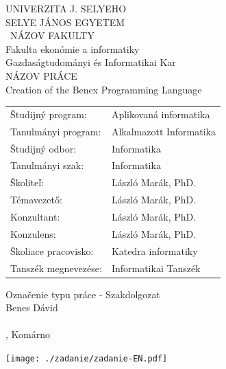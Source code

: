 \documentclass[a4paper,oneside,onecolumn,12pt]{LegrandOrangeBook}
\begin{document}
\begingroup
\makeatletter
\let\ps@plain\ps@empty
\begin{minipage}[c][\textheight][c]{\textwidth}
	{
        \centering
	    {\large UNIVERZITA J. SELYEHO\\SELYE JÁNOS EGYETEM} \\
	    \vskip0.5cm
        {\ NÁZOV FAKULTY\\Fakulta ekonómie a informatiky\\Gazdaságtudományi és Informatikai Kar} \\
        \vfill
        {\Large NÁZOV PRÁCE\\Creation of the Benex Programming Language } \\
        \vfill
        \thispagestyle{empty}
        \begin{tabular}{ll}
            Študijný program:    & Aplikovaná informatika \\
            Tanulmányi program:  & Alkalmazott Informatika \\
            Študijný odbor:      & Informatika \\
            Tanulmányi szak:     & Informatika \\
            Školiteľ:            & László Marák, PhD. \\
            Témavezető:          & László Marák, PhD. \\
            Konzultant:          & László Marák, PhD. \\
            Konzulens:           & László Marák, PhD. \\
            Školiace pracovisko: & Katedra informatiky \\
            Tanszék megnevezése: & Informatikai Tanszék \\
        \end{tabular}
        \vfill
        Označenie typu práce - Szakdolgozat \\
        Benes Dávid \\
        \ISBN \\
        \hfill\the\year{}, Komárno\hfill
	}
\end{minipage}
\endgroup

{
    \hspace*{-2cm}
    \texttt{[image: ./zadanie/zadanie-EN.pdf]}
}

\tableofcontents
\pagebreak
\listoffigures
{}
\pagebreak

\end{document}
